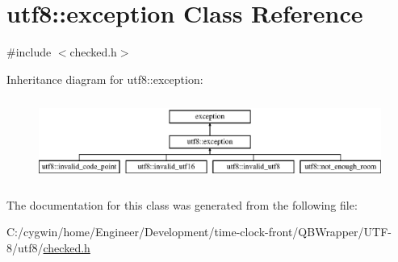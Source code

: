 \hypertarget{classutf8_1_1exception}{}\section{utf8\+:\+:exception Class Reference}
\label{classutf8_1_1exception}


{\ttfamily \#include $<$checked.\+h$>$}

Inheritance diagram for utf8\+:\+:exception\+:\begin{figure}[H]
\begin{center}
\leavevmode
\includegraphics[height=2.745098cm]{classutf8_1_1exception}
\end{center}
\end{figure}


The documentation for this class was generated from the following file\+:\begin{DoxyCompactItemize}
\item 
C\+:/cygwin/home/\+Engineer/\+Development/time-\/clock-\/front/\+Q\+B\+Wrapper/\+U\+T\+F-\/8/utf8/\hyperlink{checked_8h}{checked.\+h}\end{DoxyCompactItemize}
